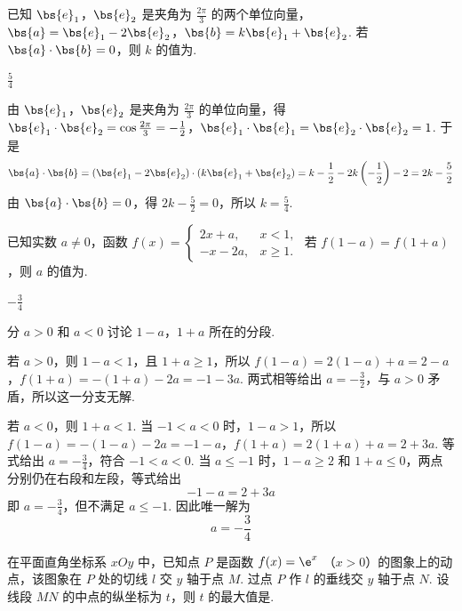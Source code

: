 \begin{problem}
已知 \(\bs{e}_1\)，\(\bs{e}_2\) 是夹角为 \(\frac{2\pi}{3}\) 的两个单位向量，\(\bs{a}=\bs{e}_1-2\bs{e}_2\)，\(\bs{b}=k\bs{e}_1+\bs{e}_2\). 若 \(\bs{a}\cdot\bs{b}=0\)，则 \(k\) 的值为\fillinblank{}.
\end{problem}

\begin{answer}
\(\frac{5}{4}\)
\end{answer}

\begin{solution}
由 \(\bs{e}_1\)，\(\bs{e}_2\) 是夹角为 \(\frac{2\pi}{3}\) 的单位向量，得
\(\bs{e}_1\cdot\bs{e}_2=\cos\frac{2\pi}{3}=-\frac12\)，\(\bs{e}_1\cdot\bs{e}_1=\bs{e}_2\cdot\bs{e}_2=1\).
于是
\[
\bs{a}\cdot\bs{b}=(\bs{e}_1-2\bs{e}_2)\cdot(k\bs{e}_1+\bs{e}_2)
=k-\frac12-2k\left(-\frac12\right)-2
=2k-\frac52
\]
由 \(\bs{a}\cdot\bs{b}=0\)，得 \(2k-\frac52=0\)，所以 \(k=\frac54\).
\end{solution}

\begin{problem}
已知实数 \(a\neq 0\)，函数 \(f(x)=\begin{cases}
2x+a, & x<1,\\
-x-2a, & x\geqslant 1.
\end{cases}\)
若 \(f(1-a)=f(1+a)\)，则 \(a\) 的值为\fillinblank{}.
\end{problem}

\begin{answer}
\(-\frac{3}{4}\)
\end{answer}

\begin{solution}
分 \(a>0\) 和 \(a<0\) 讨论 \(1-a\)，\(1+a\) 所在的分段.

若 \(a>0\)，则 \(1-a<1\)，且 \(1+a\geqslant1\)，所以
\(f(1-a)=2(1-a)+a=2-a\)，\(f(1+a)=-(1+a)-2a=-1-3a\).
两式相等给出 \(a=-\frac32\)，与 \(a>0\) 矛盾，所以这一分支无解.

若 \(a<0\)，则 \(1+a<1\). 当 \(-1<a<0\) 时，\(1-a>1\)，所以
\(f(1-a)=-(1-a)-2a=-1-a\)，\(f(1+a)=2(1+a)+a=2+3a\).
等式给出 \(a=-\frac34\)，符合 \(-1<a<0\). 当 \(a\leqslant-1\) 时，\(1-a\geqslant2\) 和 \(1+a\leqslant0\)，两点分别仍在右段和左段，等式给出
\[
-1-a=2+3a
\]
即 \(a=-\frac34\)，但不满足 \(a\leqslant-1\). 因此唯一解为
\[
a=-\frac34
\]
\end{solution}

\begin{problem}
在平面直角坐标系 \(xOy\) 中，已知点 \(P\) 是函数 \(f(x)=\e^x\) （\(x>0\)）的图象上的动点，该图象在 \(P\) 处的切线 \(l\) 交 \(y\) 轴于点 \(M\). 过点 \(P\) 作 \(l\) 的垂线交 \(y\) 轴于点 \(N\). 设线段 \(MN\) 的中点的纵坐标为 \(t\)，则 \(t\) 的最大值是\fillinblank{}.
\end{problem}

